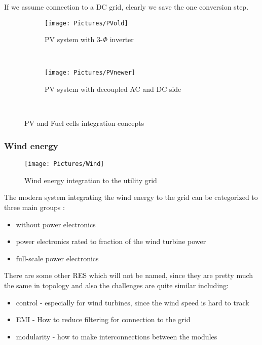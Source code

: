 \documentclass[]{scrartcl}
\begin{document}
If we assume connection to a DC grid, clearly we save the one conversion step. 
\begin{figure}[h!]
	\centering
	\begin{subfigure}[b]{0.45\textwidth}
		\texttt{[image: Pictures/PVold]}
		\caption{PV system with 3-$\Phi$ inverter \cite{Chakraborty2009}}
		\label{fig:PVold}
	\end{subfigure}
	~ %
	\begin{subfigure}[b]{0.45\textwidth}
		\texttt{[image: Pictures/PVnewer]}
		\caption{PV system with decoupled AC and DC side \cite{Chakraborty2009}}
		\label{fig:PVnew}
	\end{subfigure}
	~ %
	
	\caption{PV and Fuel cells integration concepts}\label{fig:PVgrids}
\end{figure}
\newpage
\subsubsection{Wind energy}
\begin{figure}[h!]
	\centering
	\texttt{[image: Pictures/Wind]}
	\caption{Wind energy integration to the utility grid}
	\label{fig:Wind}
\end{figure}

The modern system integrating the wind energy to the grid can be categorized to three main groups \cite{Technology2015}:
\begin{itemize}
	\item without power electronics
	\item power electronics rated to fraction of the wind turbine power
	\item full-scale power electronics
\end{itemize}

There are some other RES which will not be named, since they are pretty much the same in topology and also the challenges are quite similar including: 
\begin{itemize}
	\item control - especially for wind turbines, since the wind speed is hard to track
	\item EMI - How to reduce filtering for connection to the grid
	\item modularity - how to make interconnections between the modules
\end{itemize}
\end{document}
